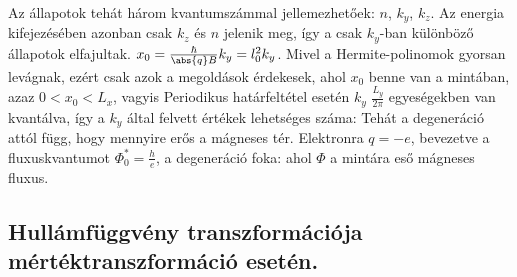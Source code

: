     Az állapotok tehát három kvantumszámmal jellemezhetőek: $n$, $k_y$, $k_z$.
   Az energia kifejezésében azonban csak $k_z$ és $n$ jelenik meg, így a csak $k_y$-ban különböző állapotok elfajultak. $x_0= \frac{\hbar}{\abs{q}B}k_y=l_0^2 k_y$.
   Mivel a Hermite-polinomok gyorsan levágnak, ezért csak azok a megoldások érdekesek, ahol $x_0$ benne van a mintában, azaz $0<x_0<L_x$, vagyis 
    Periodikus határfeltétel esetén $k_y$ $\frac{L_y}{2\pi}$ egyeségekben van kvantálva, így a $k_y$ által felvett értékek lehetséges száma:
    Tehát a degeneráció attól függ, hogy mennyire erős a mágneses tér.
   Elektronra $q=-e$, bevezetve a fluxuskvantumot $\Phi_0^*=\frac{h}{e}$, a degeneráció foka:
    ahol $\Phi$ a mintára eső mágneses fluxus.

  \subsection{Hullámfüggvény transzformációja mértéktranszformáció esetén. }
   
